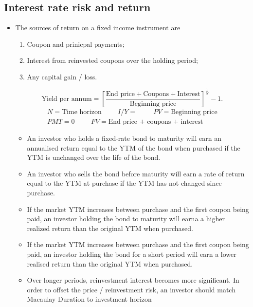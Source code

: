 \documentclass[../notes_compiled.tex]{subfiles}
\begin{document}
\subsection{Interest rate risk and return}
\begin{itemize}
\item The sources of return on a fixed income instrument are
\begin{enumerate}
\item Coupon and prinicpal payments;
\item Interest from reinvested coupons over the holding period;
\item Any capital gain / loss.
\end{enumerate}
\begin{equation}
\text{Yield per annum} = \left[ \frac{\text{End price} + \text{Coupons} + \text{Interest}}{\text{Beginning price}}\right]^{\frac{1}{N}} -1.
\end{equation}
\begin{gather*}
N=\text{Time horizon} \hspace{1cm} I / Y = \hspace{1cm} PV =\text{Beginning price} \\
PMT=0 \hspace{1cm} FV=\text{End price + coupons + interest}
\end{gather*}
\begin{itemize}
\item An investor who holds a fixed-rate bond to maturity will earn an annualised return equal to the YTM of the bond when purchased if the YTM is unchanged over the life of the bond.
\item An investor who sells the bond before maturity will earn a rate of return equal to the YTM at purchase if the YTM has not changed since purchase.
\item If the market YTM increases between purchase and the first coupon being paid, an investor holding the bond to maturity will earna a higher realized return than the original YTM when purchased.
\item If the market YTM increases between purchase and the first coupon being paid, an investor holding the bond for a short period will earn a lower realised return than the original YTM when purchased.
\item[$\Rightarrow$] Over longer periods, reinvestment interest becomes more significant. In order to offset the price / reinvestment risk, an investor should match Macaulay Duration to investment horizon
\end{itemize}
\end{itemize}
\end{document}
